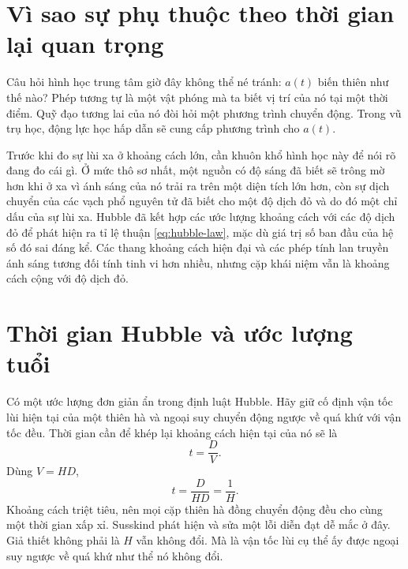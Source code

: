 \section{Vì sao sự phụ thuộc theo thời gian lại quan trọng}

Câu hỏi hình học trung tâm giờ đây không thể né tránh: \(a(t)\) biến thiên như thế nào? Phép tương tự là một vật phóng mà ta biết vị trí của nó tại một thời điểm. Quỹ đạo tương lai của nó đòi hỏi một phương trình chuyển động. Trong vũ trụ học, động lực học hấp dẫn sẽ cung cấp phương trình cho \(a(t)\).

\begin{classroomqa}
\end{classroomqa}

Trước khi đo sự lùi xa ở khoảng cách lớn, cần khuôn khổ hình học này để nói rõ đang đo cái gì. Ở mức thô sơ nhất, một nguồn có độ sáng đã biết sẽ trông mờ hơn khi ở xa vì ánh sáng của nó trải ra trên một diện tích lớn hơn, còn sự dịch chuyển của các vạch phổ nguyên tử đã biết cho một độ dịch đỏ và do đó một chỉ dấu của sự lùi xa. Hubble đã kết hợp các ước lượng khoảng cách với các độ dịch đỏ để phát hiện ra tỉ lệ thuận \eqref{eq:hubble-law}, mặc dù giá trị số ban đầu của hệ số đó sai đáng kể. Các thang khoảng cách hiện đại và các phép tính lan truyền ánh sáng tương đối tính tinh vi hơn nhiều, nhưng cặp khái niệm vẫn là khoảng cách cộng với độ dịch đỏ.

\section{Thời gian Hubble và ước lượng tuổi}

Có một ước lượng đơn giản ẩn trong định luật Hubble. Hãy giữ cố định vận tốc lùi hiện tại của một thiên hà và ngoại suy chuyển động ngược về quá khứ với vận tốc đều. Thời gian cần để khép lại khoảng cách hiện tại của nó sẽ là
\begin{equation}
  t=\frac{D}{V}.
\end{equation}
Dùng \(V=HD\),
\begin{equation}
  t=\frac{D}{HD}=\frac{1}{H}.
  \label{eq:hubble-time}
\end{equation}
Khoảng cách triệt tiêu, nên mọi cặp thiên hà đồng chuyển động đều cho cùng một thời gian xấp xỉ. Susskind phát hiện và sửa một lỗi diễn đạt dễ mắc ở đây. Giả thiết không phải là \(H\) vẫn không đổi. Mà là vận tốc lùi cụ thể ấy được ngoại suy ngược về quá khứ như thể nó không đổi.

